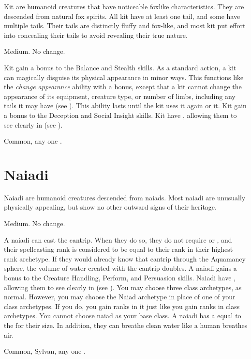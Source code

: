 Kit are humanoid creatures that have noticeable foxlike characteristics.
They are descended from natural fox spirits.
All kit have at least one tail, and some have multiple tails.
Their tails are distinctly fluffy and fox-like, and most kit put effort into concealing their tails to avoid revealing their true nature.

 Medium.
 No change.
\begin{itemize}
	 Kit gain a  bonus to the Balance and Stealth skills.
	 As a standard action, a kit can magically disguise its physical appearance in minor ways.
	      This functions like the \textit{change appearance} ability with a  bonus, except that a kit cannot change the appearance of its equipment, creature type, or number of limbs, including any tails it may have (see ).
	      This ability lasts until the kit uses it again or  it.
	 Kit gain a  bonus to the Deception and Social Insight skills.
	 Kit have , allowing them to see clearly in  (see ).
\end{itemize}
 Common, any one .

\section{Naiadi}
Naiadi are humanoid creatures descended from naiads.
Most naiadi are unusually physically appealing, but show no other outward signs of their heritage.

 Medium.
 No change.
\begin{itemize}
	 A naiadi can cast the  cantrip.
	      When they do so, they do not require  or , and their spellcasting rank is considered to be equal to their rank in their highest rank archetype.
	      If they would already know that cantrip through the Aquamancy sphere, the volume of water created with the cantrip doubles.
	 A naiadi gains a  bonus to the Creature Handling, Perform, and Persuasion skills.
	 Naiadi have , allowing them to see clearly in  (see ).
	 You may choose three class archetypes, as normal.
	      However, you may choose the Naiad archetype in place of one of your class archetypes.
	      If you do, you gain ranks in it just like you gain ranks in class archetypes.
	      You cannot choose naiad as your base class.
	 A naiadi has a  equal to the  for their size.
	      In addition, they can breathe clean water like a human breathes air.
\end{itemize}
 Common, Sylvan, any one .

